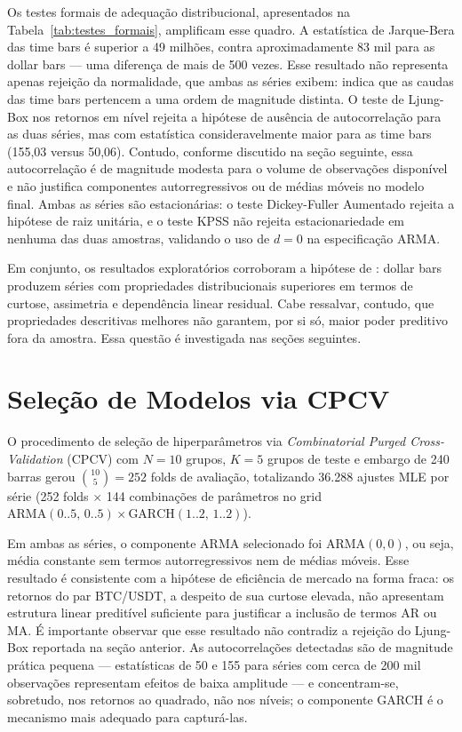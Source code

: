 Os testes formais de adequação distribucional, apresentados na Tabela~\ref{tab:testes_formais},
amplificam esse quadro. A estatística de Jarque-Bera das time bars é superior a 49 milhões,
contra aproximadamente 83 mil para as dollar bars — uma diferença de mais de 500 vezes.
Esse resultado não representa apenas rejeição da normalidade, que ambas as séries exibem:
indica que as caudas das time bars pertencem a uma ordem de magnitude distinta. O teste
de Ljung-Box nos retornos em nível rejeita a hipótese de ausência de autocorrelação
para as duas séries, mas com estatística consideravelmente maior para as time bars
(155,03 versus 50,06). Contudo, conforme discutido na seção seguinte, essa autocorrelação
é de magnitude modesta para o volume de observações disponível e não justifica componentes
autorregressivos ou de médias móveis no modelo final. Ambas as séries são estacionárias:
o teste Dickey-Fuller Aumentado rejeita a hipótese de raiz unitária, e o teste KPSS não
rejeita estacionariedade em nenhuma das duas amostras, validando o uso de $d = 0$ na
especificação ARMA.

Em conjunto, os resultados exploratórios corroboram a hipótese de \citet{Prado2018}:
dollar bars produzem séries com propriedades distribucionais superiores em termos de
curtose, assimetria e dependência linear residual. Cabe ressalvar, contudo, que propriedades
descritivas melhores não garantem, por si só, maior poder preditivo fora da amostra.
Essa questão é investigada nas seções seguintes.

\section{Seleção de Modelos via CPCV}
\label{sec:selecao_modelos}

O procedimento de seleção de hiperparâmetros via \textit{Combinatorial Purged Cross-Validation}
(CPCV) com $N = 10$ grupos, $K = 5$ grupos de teste e embargo de 240 barras gerou
$\binom{10}{5} = 252$ folds de avaliação, totalizando 36.288 ajustes MLE por série
(252 folds $\times$ 144 combinações de parâmetros no grid
$\text{ARMA}(0..5,\,0..5) \times \text{GARCH}(1..2,\,1..2)$).

Em ambas as séries, o componente ARMA selecionado foi ARMA$(0,0)$, ou seja, média constante
sem termos autorregressivos nem de médias móveis. Esse resultado é consistente com a
hipótese de eficiência de mercado na forma fraca: os retornos do par BTC/USDT, a despeito
de sua curtose elevada, não apresentam estrutura linear preditível suficiente para justificar
a inclusão de termos AR ou MA. É importante observar que esse resultado não contradiz a
rejeição do Ljung-Box reportada na seção anterior. As autocorrelações detectadas são de
magnitude prática pequena — estatísticas de 50 e 155 para séries com cerca de 200 mil
observações representam efeitos de baixa amplitude — e concentram-se, sobretudo, nos
retornos ao quadrado, não nos níveis; o componente GARCH é o mecanismo mais adequado
para capturá-las.

